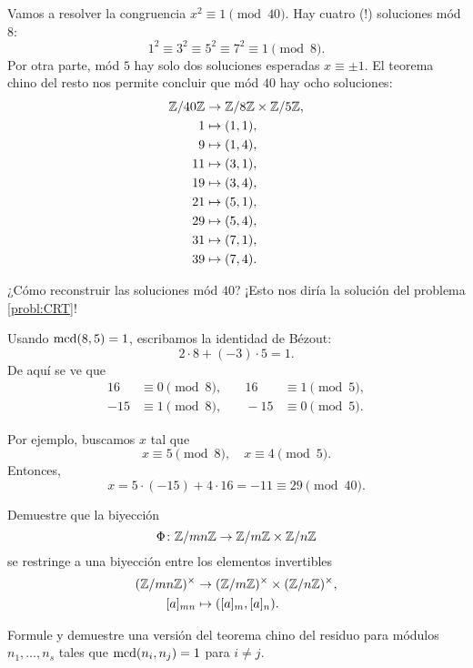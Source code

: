 \documentclass{article}
\begin{document}
\begin{ejemplo}
  Vamos a resolver la congruencia $x^2 \equiv 1 \pmod{40}$.
  Hay cuatro (!)  soluciones mód $8$:
  $$1^2 \equiv 3^2 \equiv 5^2 \equiv 7^2 \equiv 1 \pmod{8}.$$
  Por otra parte, mód $5$ hay solo dos soluciones esperadas $x \equiv \pm 1$.
  El teorema chino del resto nos permite concluir que mód $40$ hay ocho
  soluciones:
    \begin{align*}
      \mathbb{Z}/40\mathbb{Z} & \to \mathbb{Z}/8\mathbb{Z} \times \mathbb{Z}/5\mathbb{Z}, \\
      1 & \mapsto (1, 1), \\
      9 & \mapsto (1, 4), \\
      11 & \mapsto (3, 1), \\
      19 & \mapsto (3, 4), \\
      21 & \mapsto (5, 1), \\
      29 & \mapsto (5, 4), \\
      31 & \mapsto (7, 1), \\
      39 & \mapsto (7, 4).
    \end{align*}

  ¿Cómo reconstruir las soluciones mód $40$?
  ¡Esto nos diría la solución del problema \ref{probl:CRT}!

  Usando $\operatorname{mcd}(8,5) = 1$, escribamos la identidad de Bézout:
  $$2\cdot 8 + (-3)\cdot 5 = 1.$$
  De aquí se ve que
  \begin{align*}
    16 & \equiv 0 \pmod{8}, & \quad 16 & \equiv 1 \pmod{5}, \\
    -15 & \equiv 1 \pmod{8}, & \quad -15 & \equiv 0 \pmod{5}.
  \end{align*}

  Por ejemplo, buscamos $x$ tal que
  $$x \equiv 5 \pmod{8}, \quad x \equiv 4 \pmod{5}.$$
  Entonces,
  $$x = 5\cdot (-15) + 4\cdot 16 = -11 \equiv 29 \pmod{40}.$$
\end{ejemplo}

\begin{problema}
  \label{probl:crt-invertibles}
  Demuestre que la biyección
  $$\Phi\colon \mathbb{Z}/mn\mathbb{Z} \to \mathbb{Z}/m\mathbb{Z} \times \mathbb{Z}/n\mathbb{Z}$$
  se restringe a una biyección entre los elementos invertibles
  \begin{align*}
    (\mathbb{Z}/mn\mathbb{Z})^\times & \to (\mathbb{Z}/m\mathbb{Z})^\times \times (\mathbb{Z}/n\mathbb{Z})^\times, \\
    [a]_{mn} & \mapsto ([a]_m, [a]_n).
  \end{align*}
\end{problema}

\begin{problema}
  Formule y demuestre una versión del teorema chino del residuo para módulos
  $n_1, \ldots, n_s$ tales que $\operatorname{mcd} (n_i,n_j) = 1$ para $i \ne j$.
\end{problema}
\end{document}
